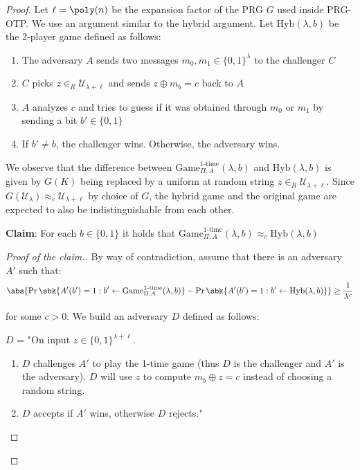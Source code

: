 \documentclass[a4paper, 12pt]{report}
\begin{document}
    \begin{proof}
        Let $\ell = \poly(n)$ be the expansion factor of the PRG $G$ used inside PRG-OTP. We use an argument similar to the hybrid argument. Let $\mathrm{Hyb}(\lambda, b)$ be the 2-player game defined as follows:
        \begin{enumerate}
            \item The adversary $A$ sends two messages $m_0, m_1 \in \{0,1\}^\lambda$ to the challenger $C$
            \item $C$ picks $z \in_R \mathcal{U}_{\lambda+\ell}$ and sends $z \oplus m_b = c$ back to $A$
            \item $A$ analyzes $c$ and tries to guess if it was obtained through $m_0$ or $m_1$ by sending a bit $b' \in \{0,1\}$
            \item If $b' \neq b$, the challenger wins. Otherwise, the adversary wins. 
        \end{enumerate}

        We observe that the difference between $\mathrm{Game}_{\Pi, A}^{\text{1-time}}(\lambda, b)$ and $\mathrm{Hyb}(\lambda, b)$ is given by $G(K)$ being replaced by a uniform at random string $z \in_R \mathcal{U}_{\lambda+\ell}$. Since $G(\mathcal{U}_\lambda) \approx_c \mathcal{U}_{\lambda+\ell}$ by choice of $G$, the hybrid game and the original game are expected to also be indistinguishable from each other.
        
        \textbf{Claim}: For each $b \in \{0,1\}$ it holds that $\mathrm{Game}_{\Pi, A}^{\text{1-time}}(\lambda, b) \approx_c \mathrm{Hyb}(\lambda, b)$

        \begin{proof}[Proof of the claim.]
            By way of contradiction, assume that there is an adversary $A'$ such that:
            \[\abs{\Pr\sbk{A'(b') = 1 : b' \gets \mathrm{Game}_{\Pi, A}^{\text{1-time}}(\lambda, b)} - \Pr\sbk{A'(b') = 1 : b' \gets \mathrm{Hyb}(\lambda, b)}} \geq \frac{1}{\lambda^c}\]

            for some $c > 0$. We build an adversary $D$ defined as follows:

            $D$ = "On input $z \in \{0,1\}^{\lambda+\ell}$.
            \begin{enumerate}
                \item $D$ challenges $A'$ to play the 1-time game (thus $D$ is the challenger and $A'$ is the adversary). $D$ will use $z$ to compute $m_b \oplus z = c$ instead of choosing a random string.
                \item $D$ accepts if $A'$ wins, otherwise $D$ rejects."
            \end{enumerate}


\end{proof}
\end{proof}
\end{document}
